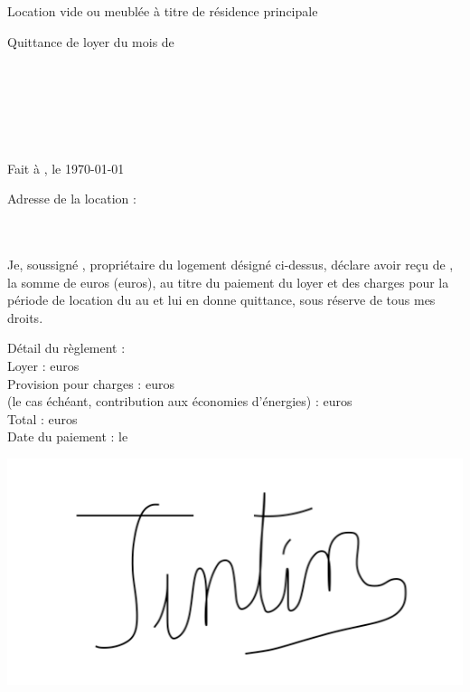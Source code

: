 \documentclass[12pt,a4paper]{article}
\begin{document}
\thispagestyle{empty}

\begin{center}
Location vide ou meublée à titre de résidence principale\\
\begin{LARGE}
Quittance de loyer du mois de \nommois\space\annee
\end{LARGE}
\end{center}
\bigskip

\begin{flushleft}
\nomproprio\\
\adresseproprio\\
\villeproprio
\end{flushleft}

\medskip

\begin{flushright}
\nomlocataire\\
\adresselocataire\\
\villelocataire
\end{flushright}

\medskip

\begin{flushright}
Fait à \lieudocument, le \today
\end{flushright}

\medskip

\begin{flushleft}
Adresse de la location :\\
\adresselocation\\
\lotlocation\\
\villelocation
\end{flushleft}

\medskip

\begin{flushleft}
Je, soussigné \nomproprio, propriétaire du logement désigné ci-dessus, déclare avoir reçu
de \nomlocataire, la somme de \totalpaiementchiffres\space euros (\totalpaiementlettres\space euros), au titre
du paiement du loyer et des charges pour la période de location du \debutmois\space au
\finmois\space et lui en donne quittance, sous réserve de tous mes droits.
\end{flushleft}

\medskip

\begin{flushleft}
Détail du règlement :\\
Loyer : \loyerchiffres\space euros\\
Provision pour charges : \charges\space euros\\
(le cas échéant, contribution aux économies d’énergies) : \economisenergies\space euros\\
Total : \totalpaiementchiffres\space euros\\
Date du paiement : le \datepaiement
\end{flushleft}

\medskip

\begin{center}
\includegraphics[width=0.3\linewidth]{Signature.PNG}
\end{center}
\end{document}

